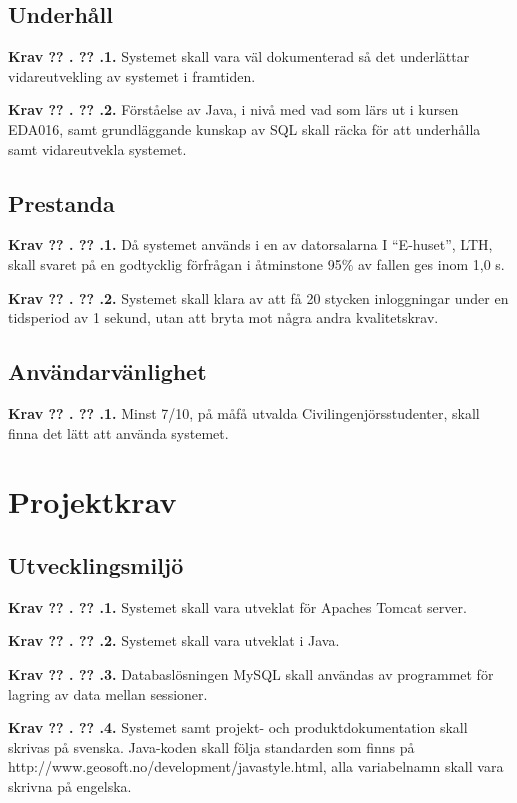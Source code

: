 \documentclass[a4paper]{article}
\newcommand\getcurrentref[1]{%
 \ifnumequal{\value{#1}}{0}
  {??}
  {\the\value{#1}}%
}
\newcommand\requirement[2]{
	\numberedrow{Krav}{#1}{#2}
}
\newcommand\numberedrow[3]{
	\noindent
	\textbf{#1 \getcurrentref{section}.\getcurrentref{subsection}.#2.} #3
	
}
\begin{document}
\subsection{Underhåll}
\requirement{1}{Systemet skall vara väl dokumenterad så det underlättar vidareutvekling av systemet i framtiden.}
\requirement{2}{Förståelse av Java, i nivå med vad som lärs ut i kursen EDA016, samt grundläggande kunskap av SQL skall räcka för att underhålla samt vidareutvekla systemet.}
\subsection{Prestanda}
\label{krav-kval-pres}
\requirement{1}{Då systemet används i en av datorsalarna I ``E-huset'', LTH, skall svaret på en godtycklig förfrågan i åtminstone 95\% av fallen ges inom 1,0 s.}
\requirement{2}{Systemet skall klara av att få 20 stycken inloggningar under en tidsperiod av 1 sekund, utan att bryta mot några andra kvalitetskrav.}
\subsection{Användarvänlighet}
\requirement{1}{Minst 7/10, på måfå utvalda Civilingenjörsstudenter, skall finna det lätt att använda systemet.}
\section{Projektkrav}
\subsection{Utvecklingsmiljö}
\requirement{1}{Systemet skall vara utveklat för Apaches Tomcat server.}
\requirement{2}{Systemet skall vara utveklat i Java.}
\requirement{3}{Databaslösningen MySQL skall användas av programmet för lagring av data mellan sessioner.}
\requirement{4}{Systemet samt projekt- och produktdokumentation skall skrivas på svenska. Java-koden skall följa standarden som finns på http://www.geosoft.no/development/javastyle.html, alla variabelnamn skall vara skrivna på engelska.}
\end{document}
